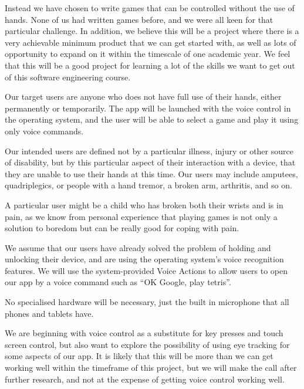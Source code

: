 \documentclass[11pt, oneside]{article}
\begin{document}
Instead we have chosen to write games that can be controlled without the use of hands. None of us had written games before, and we were all keen for that particular challenge. In addition, we believe this will be a project where there is a very achievable minimum product that we can get started with, as well as lots of opportunity to expand on it within the timescale of one academic year. We feel that this will be a good project for learning a lot of the skills we want to get out of this software engineering course.


Our target users are anyone who does not have full use of their hands,
either permanently or temporarily. The app will be launched with the
voice control in the operating system, and the user will be able to
select a game and play it using only voice commands. 

Our intended users are defined not by a particular illness, injury or
other source of disability, but by this particular aspect of their
interaction with a device, that they are unable to use their hands at
this time. Our users may include amputees, quadriplegics, or people with a hand tremor,
a broken arm, arthritis, and so on.

A particular user might be a child who has broken both their wrists and is in pain, as we know from personal experience that playing games is not only a solution to boredom but can be really good for coping with pain.

We assume that our users have already solved the problem of holding
and unlocking their device, and are using the operating system's voice recognition features. We will use the system-provided Voice Actions to allow users to open our app by a voice command such as ``OK Google, play tetris''.

No specialised hardware will be necessary, just the built in microphone that all phones and tablets have.


We are beginning with voice control as a substitute for key presses
and touch screen control, but also want to explore the possibility of
using eye tracking for some aspects of our app. It is likely that this will be more than
we can get working well within the timeframe of this project, but we
will make the call after further research, and not at the expense of getting voice control working well.
\end{document}

